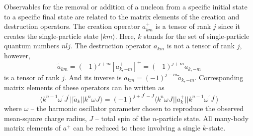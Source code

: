 \documentclass[
12pt, %
oneside, %
english, %
onehalfspacing, %
onehalfspacing, %
headsepline, %
]{MastersDoctoralThesis} %
\begin{document}
Observables for the removal or addition of a nucleon from a specific initial state to a
specific final state are related to the matrix elements of the creation and destruction
operators.
The creation operator $a^+_{km}$ is a tensor of rank $j$ since it creates the single-particle state $\vert km \rangle$. Here, $k$ stands for the set of single-particle quantum numbers $nlj$.
 The destruction operator $a_{km}$ is not a tensor of rank $j$, however,
 \begin{equation}
 \tilde{a}_{km}=(-1)^{j+m} \left[ a^+_{k,-m} \right]^+ =
 (-1)^{j+m} a_{k,-m}
 \end{equation}
is a tensor of rank $j$. And its inverse is $ a_{km}=(-1)^{j-m}\tilde{a}_{k,-m}$. 
Corresponding matrix elements of these operators can be written as
\begin{equation}
\langle
 k^{n-1} \omega^{\prime} J^{\prime}
\vert \vert
\tilde{a}_k
 \vert \vert
 k^{n} \omega^{} J^{}
  \rangle 
  = 
  (-1)^{j+J^{\prime}-J}
  \langle
  k^{n} \omega^{} J^{}
\vert \vert
{a}^{+}_k
 \vert \vert
 k^{n-1} \omega^{\prime} J^{\prime}
  \rangle 
  \label{matrix_elements_of_sa}
\end{equation}
where $\omega$ -- the harmonic oscillator parameter chosen to reproduce the observed mean-square charge radius, $J$ -- total spin of the $n$-particle state.
All many-body matrix elements of $a^+$ can be reduced to these involving a single
$k$-state.
\end{document}
